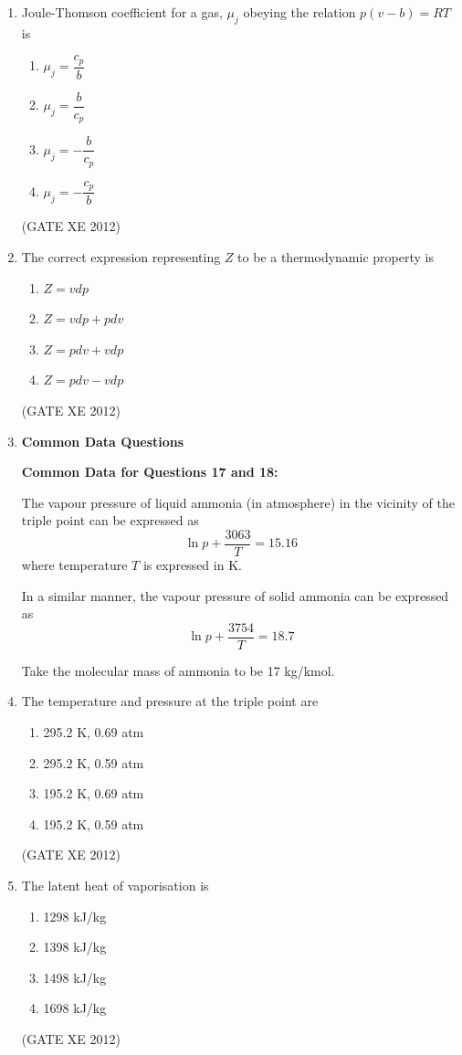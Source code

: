 \documentclass[12pt]{article}
\begin{document}
\begin{enumerate}
\item Joule-Thomson coefficient for a gas, $\mu_{j}$ obeying the relation $p(v-b) = RT$ is
\begin{multicols}{4}
\begin{enumerate}
\item $\mu_{j} = \dfrac{c_{p}}{b}$
\item $\mu_{j} = \dfrac{b}{c_{p}}$
\item $\mu_{j} = -\dfrac{b}{c_{p}}$
\item $\mu_{j} = -\dfrac{c_{p}}{b}$
\end{enumerate}
\end{multicols}
(GATE XE 2012)

\item The correct expression representing $Z$ to be a thermodynamic property is
\begin{enumerate}
\item $Z = vdp$
\item $Z = vdp + pdv$
\item $Z = pdv + vdp$
\item $Z = pdv - vdp$
\end{enumerate}
(GATE XE 2012)

\item[] {\large \textbf{Common Data Questions}}

\textbf{Common Data for Questions 17 and 18:}

The vapour pressure of liquid ammonia (in atmosphere) in the vicinity of the triple point can be expressed as  
$$\ln p + \dfrac{3063}{T} = 15.16$$  
where temperature $T$ is expressed in K.  

In a similar manner, the vapour pressure of solid ammonia can be expressed as  
$$\ln p + \dfrac{3754}{T} = 18.7$$  

Take the molecular mass of ammonia to be 17 kg/kmol.  

\item The temperature and pressure at the triple point are
\begin{multicols}{2}
\begin{enumerate}
\item 295.2 K, 0.69 atm
\item 295.2 K, 0.59 atm
\item 195.2 K, 0.69 atm
\item 195.2 K, 0.59 atm
\end{enumerate}
\end{multicols}
(GATE XE 2012)

\item The latent heat of vaporisation is
\begin{multicols}{4}
\begin{enumerate}
\item 1298 kJ/kg
\item 1398 kJ/kg
\item 1498 kJ/kg
\item 1698 kJ/kg
\end{enumerate}
\end{multicols}
(GATE XE 2012)


\end{enumerate}
\end{document}
